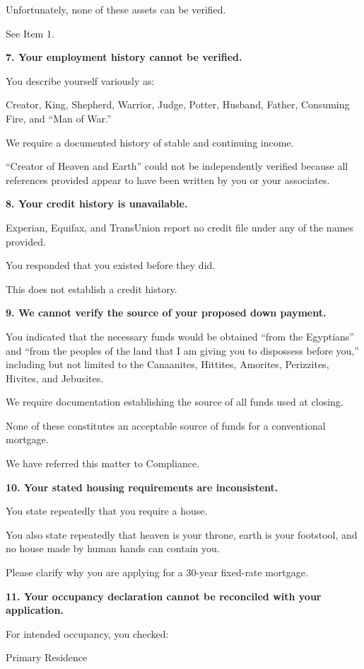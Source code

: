 {{Unfortunately, none of these assets can be verified.

See Item 1.

\textbf{7. Your employment history cannot be verified.}

You describe yourself variously as:

Creator, King, Shepherd, Warrior, Judge, Potter, Husband, Father, Consuming Fire, and ``Man of War.''

We require a documented history of stable and continuing income.

``Creator of Heaven and Earth'' could not be independently verified because all references provided appear to have been written by you or your associates.

\textbf{8. Your credit history is unavailable.}

Experian, Equifax, and TransUnion report no credit file under any of the names provided.

You responded that you existed before they did.

This does not establish a credit history.

\textbf{9. We cannot verify the source of your proposed down payment.}

You indicated that the necessary funds would be obtained ``from the Egyptians'' and ``from the peoples of the land that I am giving you to dispossess before you,'' including but not limited to the Canaanites, Hittites, Amorites, Perizzites, Hivites, and Jebusites.

We require documentation establishing the source of all funds used at closing.

None of these constitutes an acceptable source of funds for a conventional mortgage.

We have referred this matter to Compliance.

\textbf{10. Your stated housing requirements are inconsistent.}

You state repeatedly that you require a house.

You also state repeatedly that heaven is your throne, earth is your footstool, and no house made by human hands can contain you.

Please clarify why you are applying for a 30-year fixed-rate mortgage.

\textbf{11. Your occupancy declaration cannot be reconciled with your application.}

For intended occupancy, you checked:

 Primary Residence

}}
